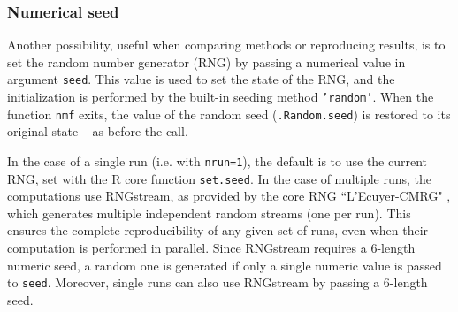 \documentclass[a4paper]{article}\usepackage{graphicx, color}
\let\code=\texttt
\begin{document}
\subsubsection{Numerical seed}\label{sec:numseed}
Another possibility, useful when comparing methods or reproducing results, is to set the random number generator (RNG) by passing a numerical value in argument \code{seed}.
This value is used to set the state of the RNG, and the initialization is performed by the built-in seeding method \code{'random'}.
When the function \code{nmf} exits, the value of the random seed (\code{.Random.seed}) is restored to its original state -- as before the call.

In the case of a single run (i.e. with \code{nrun=1}), the default is to use the current RNG, set with the R core function \code{set.seed}. 
In the case of multiple runs, the computations use RNGstream, as provided by the core RNG ``L'Ecuyer-CMRG" \cite{Lecuyer2002}, which generates multiple independent random streams (one per run).
This ensures the complete reproducibility of any given set of runs, even when their computation is performed in parallel.
Since RNGstream requires a 6-length numeric seed, a random one is generated if only a single numeric value is passed to \code{seed}.
Moreover, single runs can also use RNGstream by passing a 6-length seed.
  
\end{document}
